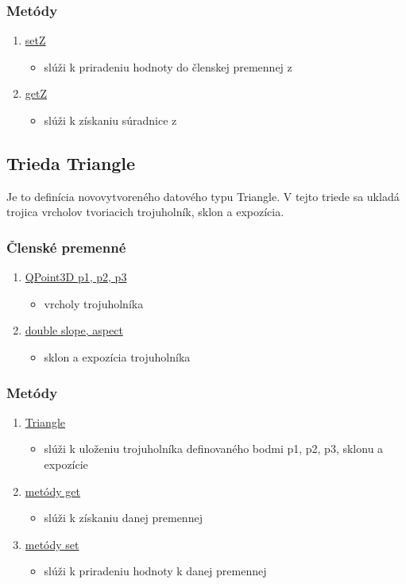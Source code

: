 \documentclass[12pt]{article}
\begin{document}
\subsubsection{Metódy}
\begin{enumerate}
\item[] \underline{setZ}
\begin{itemize}
\item slúži k priradeniu hodnoty do členskej premennej z
\end{itemize}
\item[] \underline{getZ}
\begin{itemize}
\item slúži k získaniu súradnice z
\end{itemize}
\end{enumerate}

\subsection{Trieda Triangle}
Je to definícia novovytvoreného datového typu Triangle. V tejto triede sa ukladá trojica vrcholov tvoriacich trojuholník, sklon a expozícia.

\subsubsection{Členské premenné}
\begin{enumerate}
\item[] \underline {QPoint3D p1, p2, p3}
\begin{itemize}
\item vrcholy trojuholníka
\end{itemize}
\item[] \underline {double slope, aspect}
\begin{itemize}
\item sklon a expozícia trojuholníka
\end{itemize}
\end{enumerate}

\subsubsection{Metódy}
\begin{enumerate}
\item[] \underline{Triangle}
\begin{itemize}
\item slúži k uloženiu trojuholníka definovaného bodmi p1, p2, p3, sklonu a expozície
\end{itemize}

\item[] \underline{metódy get}
\begin{itemize}
\item slúži k získaniu danej premennej
\end{itemize}

\item[] \underline{metódy set}
\begin{itemize}
\item slúži k priradeniu hodnoty k danej premennej
\end{itemize}
\end{enumerate}
\end{document}
